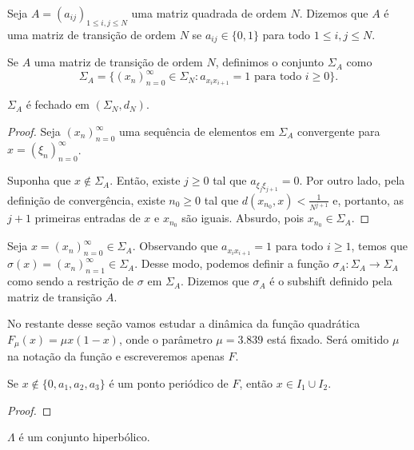 \begin{definition}
Seja $A = (a_{ij})_{1 \leq i,j \leq N}$ uma matriz quadrada de ordem $N$. Dizemos que $A$ é uma matriz de transição de ordem $N$ se $a_{ij} \in \{ 0, 1 \}$ para todo $1 \leq i,j \leq N$.
\end{definition}

Se $A$ uma matriz de transição de ordem $N$, definimos o conjunto $\Sigma_A$ como
$$\Sigma_A = \{ (x_n)_{n=0}^{\infty} \in \Sigma_N : a_{x_i x_{i+1}} = 1 \textrm{ para todo } i \geq 0 \}.$$

\begin{proposition}
$\Sigma_A$ é fechado em $(\Sigma_N, d_N)$.
\end{proposition}


\begin{proof}
Seja $(x_n)_{n=0}^{\infty}$ uma sequência de elementos em $\Sigma_A$ convergente para $x = (\xi_n)_{n=0}^{\infty}$.

Suponha que $x \notin \Sigma_A$. Então, existe $j \geq 0$ tal que $a_{\xi_j \xi_{j+1}} = 0$. Por outro lado, pela definição de convergência, existe $n_0 \geq 0$ tal que $d(x_{n_0}, x) < \frac{1}{N^{j+1}}$ e, portanto, as $j+1$ primeiras entradas de $x$ e $x_{n_0}$ são iguais. Absurdo, pois $x_{n_0} \in \Sigma_A$.
\end{proof}


Seja $x = (x_n)_{n=0}^{\infty} \in \Sigma_A$. Observando que $a_{x_i x_{i+1}} = 1$ para todo $i \geq 1$, temos que $\sigma(x) = (x_n)_{n=1}^\infty \in \Sigma_A$. Desse modo, podemos definir a função $\sigma_A: \Sigma_A \to \Sigma_A$ como sendo a restrição de $\sigma$ em $\Sigma_A$. Dizemos que $\sigma_A$ é o subshift definido pela matriz de transição $A$.

No restante desse seção vamos estudar a dinâmica da função quadrática $F_\mu(x) = \mu x(1-x)$, onde o parâmetro $\mu = 3.839$ está fixado. Será omitido $\mu$ na notação da função e escreveremos apenas $F$.

\begin{proposition}
Se $x \notin \{ 0, a_1, a_2, a_3 \}$ é um ponto periódico de $F$, então $x \in I_1 \cup I_2$.
\end{proposition}


\begin{proof}

\end{proof}


\begin{lemma}
$\Lambda$ é um conjunto hiperbólico.
\end{lemma}


